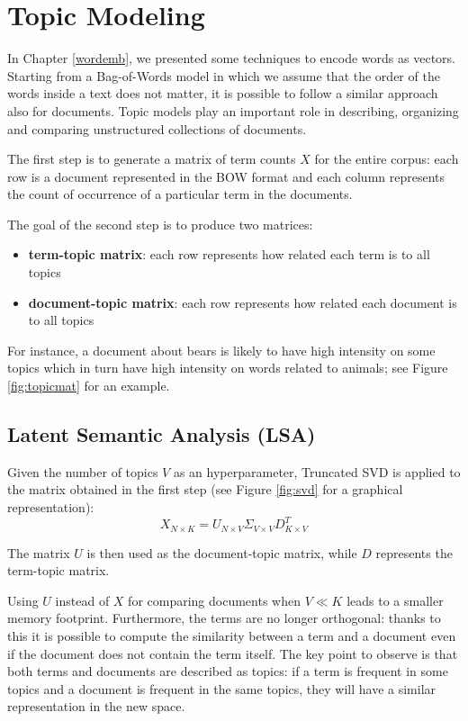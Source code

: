 \chapter{Topic Modeling} \label{topicmod}

In Chapter \ref{wordemb}, we presented some techniques to encode words as vectors.
Starting from a Bag-of-Words model in which we assume that the order of the words
inside a text does not matter, it is possible to follow a similar approach also for documents.
Topic models play an important role in describing, organizing and comparing unstructured collections of documents.

The first step is to generate a matrix of term counts $X$ for the entire corpus:
each row is a document represented in the BOW format and each column represents the count of occurrence
of a particular term in the documents.

The goal of the second step is to produce two matrices:
\begin{itemize}
    \item \textbf{term-topic matrix}: each row represents how related each term is to all topics
    \item \textbf{document-topic matrix}: each row represents how related each document is to all topics
\end{itemize}

For instance, a document about bears is likely to have high intensity on some topics which in turn have high
intensity on words related to animals; see Figure \ref{fig:topicmat} for an example.

\section{Latent Semantic Analysis (LSA)}
Given the number of topics $V$ as an hyperparameter,
Truncated SVD is applied to the matrix obtained in the first step
(see Figure \ref{fig:svd} for a graphical representation):
\[X_{N \times K} = U_{N \times V} \Sigma_{V \times V} D_{K \times V}^T\]

The matrix $U$ is then used as the document-topic matrix,
while $D$ represents the term-topic matrix.

Using $U$ instead of $X$ for comparing documents when $V \ll K$ leads to a smaller memory footprint.
Furthermore, the terms are no longer orthogonal: thanks to this it is possible to compute the similarity between
a term and a document even if the document does not contain the term itself.
The key point to observe is that both terms and documents are described as topics: if a term is frequent in some topics and
a document is frequent in the same topics, they will have a similar representation in the new space.

